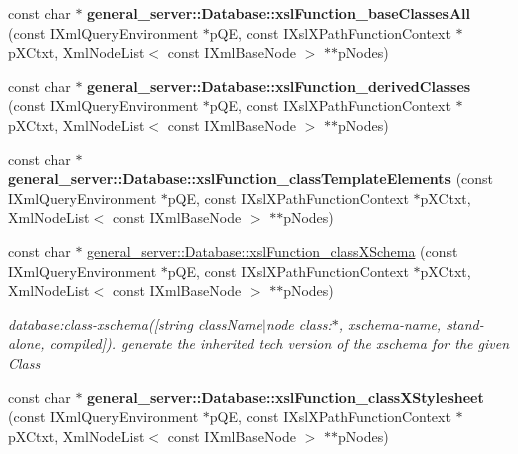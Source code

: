 \begin{DoxyCompactItemize}
\item 
\hypertarget{group__XSLModule-Functions_ga840d1f80d66322355f2735ddf607837a}{const char $\ast$ {\bfseries general\-\_\-server\-::\-Database\-::xsl\-Function\-\_\-base\-Classes\-All} (const \-I\-Xml\-Query\-Environment $\ast$p\-Q\-E, const \-I\-Xsl\-X\-Path\-Function\-Context $\ast$p\-X\-Ctxt, \-Xml\-Node\-List$<$ const \-I\-Xml\-Base\-Node $>$ $\ast$$\ast$p\-Nodes)}\label{group__XSLModule-Functions_ga840d1f80d66322355f2735ddf607837a}

\item 
\hypertarget{group__XSLModule-Functions_ga830eb53620cc28de2d5beb595acaa0d3}{const char $\ast$ {\bfseries general\-\_\-server\-::\-Database\-::xsl\-Function\-\_\-derived\-Classes} (const \-I\-Xml\-Query\-Environment $\ast$p\-Q\-E, const \-I\-Xsl\-X\-Path\-Function\-Context $\ast$p\-X\-Ctxt, \-Xml\-Node\-List$<$ const \-I\-Xml\-Base\-Node $>$ $\ast$$\ast$p\-Nodes)}\label{group__XSLModule-Functions_ga830eb53620cc28de2d5beb595acaa0d3}

\item 
\hypertarget{group__XSLModule-Functions_gabcda62084d1363b5ab7186705b3a7bf3}{const char $\ast$ {\bfseries general\-\_\-server\-::\-Database\-::xsl\-Function\-\_\-class\-Template\-Elements} (const \-I\-Xml\-Query\-Environment $\ast$p\-Q\-E, const \-I\-Xsl\-X\-Path\-Function\-Context $\ast$p\-X\-Ctxt, \-Xml\-Node\-List$<$ const \-I\-Xml\-Base\-Node $>$ $\ast$$\ast$p\-Nodes)}\label{group__XSLModule-Functions_gabcda62084d1363b5ab7186705b3a7bf3}

\item 
const char $\ast$ \hyperlink{group__XSLModule-Functions_gaecb15d87b4313f702c17cd0e209b7104}{general\-\_\-server\-::\-Database\-::xsl\-Function\-\_\-class\-X\-Schema} (const \-I\-Xml\-Query\-Environment $\ast$p\-Q\-E, const \-I\-Xsl\-X\-Path\-Function\-Context $\ast$p\-X\-Ctxt, \-Xml\-Node\-List$<$ const \-I\-Xml\-Base\-Node $>$ $\ast$$\ast$p\-Nodes)
\begin{DoxyCompactList}\small\item\em database\-:class-\/xschema(\mbox{[}string class\-Name$|$node class\-:$\ast$, xschema-\/name, stand-\/alone, compiled\mbox{]}). generate the inherited tech version of the xschema for the given \-Class \end{DoxyCompactList}\item 
\hypertarget{group__XSLModule-Functions_ga083e49023fd1786191327ea21e8a41cf}{const char $\ast$ {\bfseries general\-\_\-server\-::\-Database\-::xsl\-Function\-\_\-class\-X\-Stylesheet} (const \-I\-Xml\-Query\-Environment $\ast$p\-Q\-E, const \-I\-Xsl\-X\-Path\-Function\-Context $\ast$p\-X\-Ctxt, \-Xml\-Node\-List$<$ const \-I\-Xml\-Base\-Node $>$ $\ast$$\ast$p\-Nodes)}\label{group__XSLModule-Functions_ga083e49023fd1786191327ea21e8a41cf}


\end{DoxyCompactItemize}
